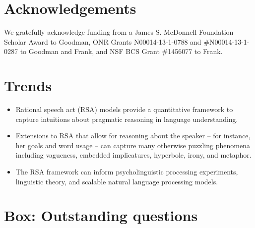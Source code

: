 \documentclass[]{elsarticle}
\begin{document}
\section{Acknowledgements}

We gratefully acknowledge funding from a James S. McDonnell Foundation Scholar Award to Goodman, 
 ONR Grants N00014-13-1-0788 and \#N00014-13-1-0287 to Goodman and Frank, and NSF BCS Grant \#1456077 to Frank.




\newpage

\appendix




\section{Trends}\label{trends-box}

\begin{itemize}
\item Rational speech act (RSA) models provide a quantitative framework to
  capture intuitions about pragmatic reasoning in language
  understanding.
\item Extensions to RSA that allow for reasoning about the speaker -- for instance, her goals and word usage -- can capture many otherwise puzzling phenomena
  including vagueness, embedded implicatures, hyperbole, irony, and
  metaphor.
\item The RSA framework can inform psycholinguistic processing experiments,
  linguistic theory, and scalable natural language processing models.
\end{itemize}

\section{Box: Outstanding questions}\label{box-outstanding-questions}
\end{document}
